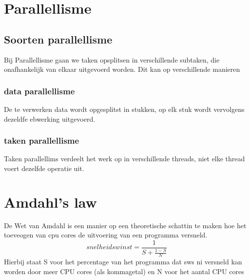 \documentclass{report}
\begin{document}
   		\section{Parallellisme}
   			\subsection{Soorten parallellisme}
   				Bij Parallellisme gaan we taken opsplitsen in verschillende subtaken, die onafhankelijk van elkaar uitgevoerd worden. Dit kan op verschillende manieren
   				\subsubsection{data parallellisme}
   					De te verwerken data wordt opgesplitst in stukken, op elk stuk wordt vervolgens dezeldfe ebwerking uitgevoerd. 
   				\subsubsection{taken parallellisme}
   					Taken parallellims verdeelt het werk op in verschillende threads, niet elke thread voert dezelfde operatie uit. 
   		\section{Amdahl's law}
   			De Wet van Amdahl is een manier op een theoretische schattin te maken hoe het toeveogen van cpu cores de uitvoering van een programma versneld. 
   			\[snelheidswinst = \frac{1}{S + \frac{1 - S}{N}}\]
   			Hierbij staat S voor het percentage van het programma dat sws ni versneld kan worden door meer CPU cores (als kommagetal) en N voor het aantal CPU cores
   			
\end{document}
